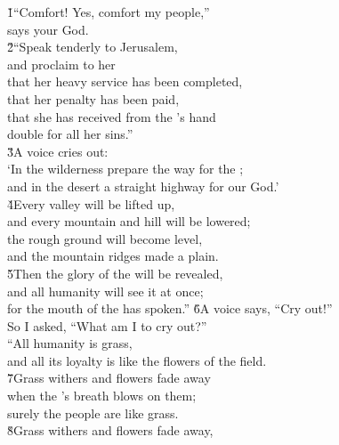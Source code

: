 \begin{poetry}
\poeml {}
\v{1}``Comfort! Yes, comfort my people,'' \\
\poemll    says your God. \\
\poeml \v{2}``Speak tenderly to Jerusalem, \\
\poemll    and proclaim to her \\
\poeml that her heavy service has been completed, \\
\poemll    that her penalty has been paid, \\
\poeml that she has received from the 's hand \\
\poemll    double for all her sins.'' \\
\poeml \v{3}A voice cries out: \\
\poemll    `In the wilderness prepare the way for the ; \\
\poemlll       and in the desert a straight highway for our God.' \\
\poeml \v{4}Every valley will be lifted up, \\
\poemll    and every mountain and hill will be lowered; \\
\poeml the rough ground will become level, \\
\poemll    and the mountain ridges made a plain. \\
\poeml \v{5}Then the glory of the  will be revealed, \\
\poemll    and all humanity will see it at once; \\
\poemlll       for the mouth of the  has spoken.''
\poeml \v{6}A voice says, ``Cry out!'' \\
\poemll    So I asked, ``What am I to cry out?'' \\
\poeml ``All humanity is grass, \\
\poemll    and all its loyalty is like the flowers of the field. \\
\poeml \v{7}Grass withers and flowers fade away \\
\poemll    when the 's breath blows on them; \\
\poemlll       surely the people are like grass. \\
\poeml \v{8}Grass withers and flowers fade away, \\

\end{poetry}
